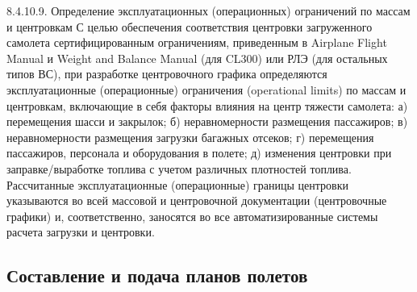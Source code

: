 8.4.10.9. Определение эксплуатационных (операционных) ограничений по массам и центровкам 
С целью обеспечения соответствия центровки загруженного самолета сертифицированным ограничениям, приведенным в Airplane Flight Manual и Weight and Balance Manual (для CL300) или РЛЭ (для остальных типов ВС), при разработке центровочного графика определяются эксплуатационные (операционные) ограничения (operational limits) по массам и центровкам, включающие в себя факторы влияния на центр тяжести самолета: 
а)	перемещения шасси и закрылок; 
б)	неравномерности размещения пассажиров; 
в)	неравномерности размещения загрузки багажных отсеков; 
г)	перемещения пассажиров, персонала и оборудования в полете; 
д)	изменения центровки при заправке/выработке топлива с учетом различных плотностей топлива. 
Рассчитанные эксплуатационные (операционные) границы центровки указываются во всей массовой и центровочной документации (центровочные графики) и, соответственно, заносятся во все автоматизированные системы расчета загрузки и центровки.


\subsection{Составление и подача планов полетов}

